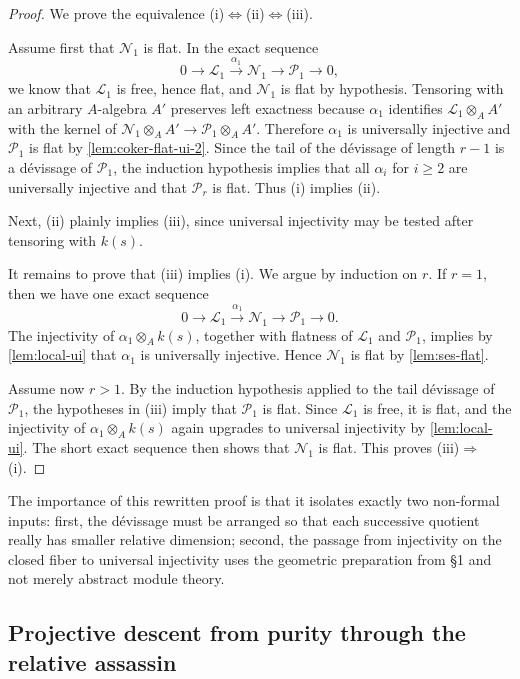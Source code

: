 \documentclass[11pt,oneside]{article}
\newcommand{\Lcal}{\mathcal L}
\newcommand{\N}{\mathcal N}
\newcommand{\Pcal}{\mathcal P}
\newcommand{\ot}{\otimes}
\begin{document}
\begin{proof}
We prove the equivalence (i)$\Leftrightarrow$(ii)$\Leftrightarrow$(iii).

Assume first that $\N_1$ is flat.  In the exact sequence
\[
0\to \Lcal_1\xrightarrow{\alpha_1}\N_1\to \Pcal_1\to 0,
\]
we know that $\Lcal_1$ is free, hence flat, and $\N_1$ is flat by hypothesis.  Tensoring with an arbitrary $A$-algebra $A'$ preserves left exactness because $\alpha_1$ identifies $\Lcal_1\ot_A A'$ with the kernel of $\N_1\ot_A A'\to \Pcal_1\ot_A A'$.  Therefore $\alpha_1$ is universally injective and $\Pcal_1$ is flat by \cref{lem:coker-flat-ui-2}.  Since the tail of the d\'evissage of length $r-1$ is a d\'evissage of $\Pcal_1$, the induction hypothesis implies that all $\alpha_i$ for $i\ge2$ are universally injective and that $\Pcal_r$ is flat.  Thus (i) implies (ii).

Next, (ii) plainly implies (iii), since universal injectivity may be tested after tensoring with $k(s)$.

It remains to prove that (iii) implies (i).  We argue by induction on $r$.  If $r=1$, then we have one exact sequence
\[
0\to \Lcal_1\xrightarrow{\alpha_1}\N_1\to \Pcal_1\to 0.
\]
The injectivity of $\alpha_1\otimes_A k(s)$, together with flatness of $\Lcal_1$ and $\Pcal_1$, implies by \cref{lem:local-ui} that $\alpha_1$ is universally injective.  Hence $\N_1$ is flat by \cref{lem:ses-flat}.

Assume now $r>1$.  By the induction hypothesis applied to the tail d\'evissage of $\Pcal_1$, the hypotheses in (iii) imply that $\Pcal_1$ is flat.  Since $\Lcal_1$ is free, it is flat, and the injectivity of $\alpha_1\otimes_A k(s)$ again upgrades to universal injectivity by \cref{lem:local-ui}.  The short exact sequence then shows that $\N_1$ is flat.  This proves (iii)$\Rightarrow$(i).
\end{proof}

The importance of this rewritten proof is that it isolates exactly two non-formal inputs: first, the d\'evissage must be arranged so that each successive quotient really has smaller relative dimension; second, the passage from injectivity on the closed fiber to universal injectivity uses the geometric preparation from \S1 and not merely abstract module theory.

\subsection{Projective descent from purity through the relative assassin}
\end{document}

